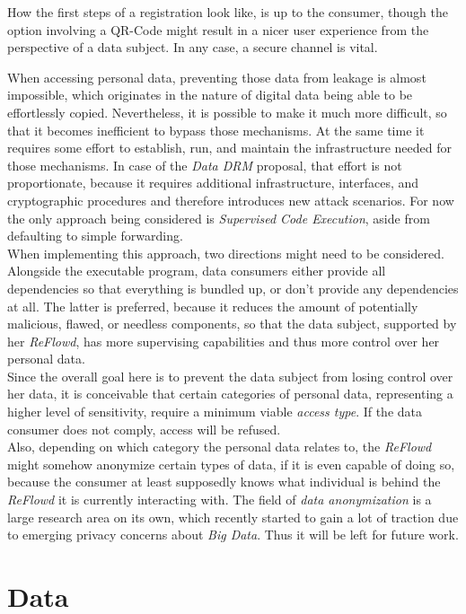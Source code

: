 \documentclass[12pt,english,a4paper,titlepage,cleardoublepage=empty,dottedtoc]{report}
\begin{document}
How the first steps of a registration look like, is up to the consumer,
though the option involving a QR-Code might result in a nicer user
experience from the perspective of a data subject. In any case, a secure
channel is vital.

When accessing personal data, preventing those data from leakage is
almost impossible, which originates in the nature of digital data being
able to be effortlessly copied. Nevertheless, it is possible to make it
much more difficult, so that it becomes inefficient to bypass those
mechanisms. At the same time it requires some effort to establish, run,
and maintain the infrastructure needed for those mechanisms. In case of
the \emph{Data DRM} proposal, that effort is not proportionate, because
it requires additional infrastructure, interfaces, and cryptographic
procedures and therefore introduces new attack scenarios. For now the
only approach being considered is \emph{Supervised Code Execution},
aside from defaulting to simple forwarding.\\
When implementing this approach, two directions might need to be
considered. Alongside the executable program, data consumers either
provide all dependencies so that everything is bundled up, or don't
provide any dependencies at all. The latter is preferred, because it
reduces the amount of potentially malicious, flawed, or needless
components, so that the data subject, supported by her \emph{ReFlowd},
has more supervising capabilities and thus more control over her
personal data.\\
Since the overall goal here is to prevent the data subject from losing
control over her data, it is conceivable that certain categories of
personal data, representing a higher level of sensitivity, require a
minimum viable \emph{access type}. If the data consumer does not comply,
access will be refused.\\
Also, depending on which category the personal data relates to, the
\emph{ReFlowd} might somehow anonymize certain types of data, if it is
even capable of doing so, because the consumer at least supposedly knows
what individual is behind the \emph{ReFlowd} it is currently interacting
with. The field of \emph{data anonymization} is a large research area on
its own, which recently started to gain a lot of traction due to
emerging privacy concerns about \emph{Big Data}. Thus it will be left
for future work.

\hypertarget{data}{\section{Data}\label{data}}
\end{document}
